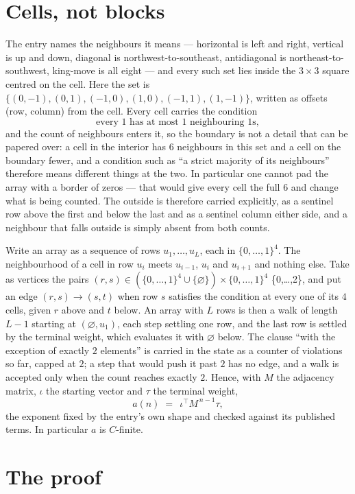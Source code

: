 \documentclass[11pt,a4paper]{article}
\theoremstyle{plain}
\theoremstyle{definition}
\begin{document}
\section{Cells, not blocks}

The entry names the neighbours it means --- horizontal is left and right, vertical is up and
down, diagonal is northwest-to-southeast, antidiagonal is northeast-to-southwest, king-move is
all eight --- and every such set lies inside the $3\times3$ square centred on the cell. Here
the set is $\{(0,-1), (0,1), (-1,0), (1,0), (-1,1), (1,-1)\}$, written as offsets (row, column) from the cell. Every cell carries
the condition
\[
\text{every 1 has at most 1 neighbouring 1s},
\]
and the count of neighbours enters it, so the boundary is not a detail that can be papered
over: a cell in the interior has $6$ neighbours in this set and a cell on the boundary
fewer, and a condition such as ``a strict majority of its neighbours'' therefore means
different things at the two. In particular one cannot pad the array with a border of zeros ---
that would give every cell the full $6$ and change what is being counted. The outside is
therefore carried
explicitly, as a sentinel row above the first and below the last and as a sentinel column
either side, and a neighbour that falls outside is simply absent from both counts.

Write an array as a sequence of rows $u_1,\dots,u_L$, each in
$\{0,\dots,1\}^{4}$. The neighbourhood of a cell in row $u_i$ meets $u_{i-1}$,
$u_i$ and $u_{i+1}$ and nothing else. Take as vertices the pairs
$(r,s)\in(\{0,\dots,1\}^{4}\cup\{\varnothing\})\times\{0,\dots,1\}^{4}$ \times \{0,\dots,2\},
and put an edge $(r,s)\to(s,t)$ when row $s$ satisfies the condition at every one of its
$4$ cells, given $r$ above and $t$ below. An array with $L$ rows is then a walk of length
$L-1$ starting at $(\varnothing,u_1)$, each step settling one row, and the last row is
settled by the terminal weight, which evaluates it with $\varnothing$ below. The clause ``with the exception of exactly $2$ elements'' is carried in
the state as a counter of violations so far, capped at $2$; a step that would push it past
$2$ has no edge, and a walk is accepted only when the count reaches exactly $2$. Hence,
with $M$ the adjacency matrix, $\iota$ the starting vector and $\tau$ the terminal weight,
\[
a(n)\;=\;\,\iota^{\!\top}M^{\,n-1}\tau ,
\]
the exponent fixed by the entry's own shape and checked against its published terms. In
particular $a$ is $C$-finite.

\section{The proof}
\end{document}
